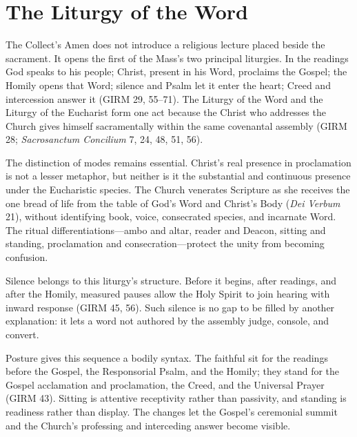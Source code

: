 \section{The Liturgy of the Word}

The Collect's Amen does not introduce a religious lecture placed beside the sacrament. It opens the first of the Mass's two principal liturgies. In the readings God speaks to his people; Christ, present in his Word, proclaims the Gospel; the Homily opens that Word; silence and Psalm let it enter the heart; Creed and intercession answer it (GIRM 29, 55--71). The Liturgy of the Word and the Liturgy of the Eucharist form one act because the Christ who addresses the Church gives himself sacramentally within the same covenantal assembly (GIRM 28; \emph{Sacrosanctum Concilium} 7, 24, 48, 51, 56).

The distinction of modes remains essential. Christ's real presence in proclamation is not a lesser metaphor, but neither is it the substantial and continuous presence under the Eucharistic species. The Church venerates Scripture as she receives the one bread of life from the table of God's Word and Christ's Body (\emph{Dei Verbum} 21), without identifying book, voice, consecrated species, and incarnate Word. The ritual differentiations---ambo and altar, reader and Deacon, sitting and standing, proclamation and consecration---protect the unity from becoming confusion.

Silence belongs to this liturgy's structure. Before it begins, after readings, and after the Homily, measured pauses allow the Holy Spirit to join hearing with inward response (GIRM 45, 56). Such silence is no gap to be filled by another explanation: it lets a word not authored by the assembly judge, console, and convert.

Posture gives this sequence a bodily syntax. The faithful sit for the readings before the Gospel, the Responsorial Psalm, and the Homily; they stand for the Gospel acclamation and proclamation, the Creed, and the Universal Prayer (GIRM 43). Sitting is attentive receptivity rather than passivity, and standing is readiness rather than display. The changes let the Gospel's ceremonial summit and the Church's professing and interceding answer become visible.


